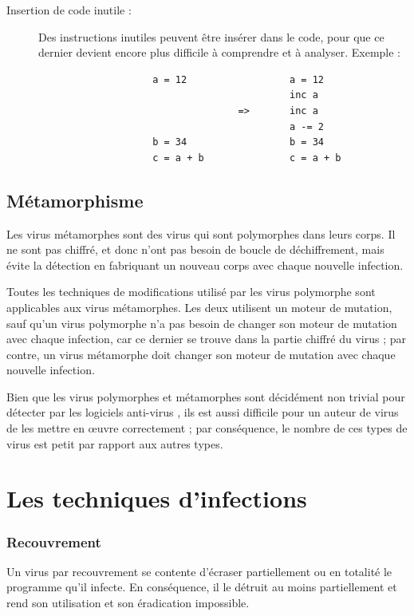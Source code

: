 \begin{description}
            \item[Insertion de code inutile :] Des instructions inutiles peuvent être insérer dans le code, pour que 
                ce dernier devient encore plus  difficile à comprendre et à analyser. Exemple :
                \begin{verbatim}
                    a = 12                  a = 12
                                            inc a
                                   =>       inc a
                                            a -= 2
                    b = 34                  b = 34
                    c = a + b               c = a + b
                \end{verbatim}
        \end{description}

    \subsection{Métamorphisme}
    Les virus métamorphes sont des virus qui sont polymorphes dans leurs corps. Il ne sont pas chiffré, et donc n'ont
    pas besoin de boucle de déchiffrement, mais évite la détection en fabriquant un nouveau corps avec chaque 
    nouvelle infection.

    Toutes les techniques de modifications utilisé par les virus polymorphe sont applicables aux virus métamorphes. 
    Les deux utilisent un moteur de mutation, sauf qu'un virus polymorphe n'a pas besoin de changer son moteur de 
    mutation avec chaque infection, car ce dernier se trouve dans la partie chiffré du virus ; par contre,
    un virus métamorphe doit changer son moteur de mutation avec chaque nouvelle infection.

    Bien que les virus polymorphes et métamorphes sont décidément non trivial pour détecter par les logiciels anti-virus
    , ils est aussi difficile pour un auteur de virus de les mettre en œuvre correctement ; par conséquence, 
    le nombre de ces types de virus est petit par rapport aux autres types.

\section{Les techniques d'infections}

        \subsubsection{Recouvrement}
        Un virus par recouvrement se contente d’écraser partiellement ou en totalité le programme 
        qu’il infecte. En conséquence, il le détruit au moins partiellement et rend son utilisation et 
        son éradication impossible.

